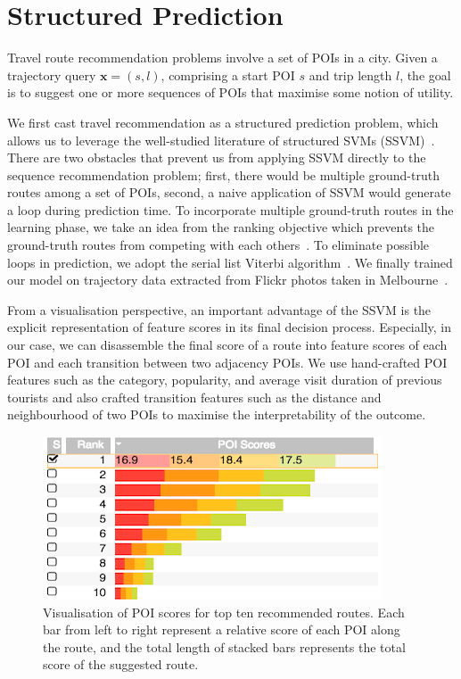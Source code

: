 \section{Structured Prediction}
Travel route recommendation problems involve a set of POIs in a city. 
Given a trajectory query $\mathbf{x} = (s, l)$, comprising a start POI $s$ and trip length $l$, the goal is to suggest one or more sequences of POIs that maximise some notion of utility.

We first cast travel recommendation as a structured prediction problem, which allows us to leverage the well-studied literature of structured SVMs (SSVM)~\cite{tsochantaridis2005large,joachims2009predicting}. 
There are two obstacles that prevent us from applying SSVM directly to the sequence recommendation problem; first, there would be multiple ground-truth routes among a set of POIs, second, a naive application of SSVM would generate a loop during prediction time. 
To incorporate multiple ground-truth routes in the learning phase, we take an idea from the ranking objective which prevents the ground-truth routes from competing with each others~\cite{rendle2009bpr}. 
To eliminate possible loops in prediction, we adopt the serial list Viterbi algorithm~\cite{seshadri1994list,nill1995list,nilsson2001sequentially}.
We finally trained our model on trajectory data extracted from Flickr photos taken in Melbourne~\cite{chen2016learning}.

From a visualisation perspective, an important advantage of the SSVM is the explicit representation of feature scores in its final decision process. Especially, in our case, we can disassemble the final score of a route into feature scores of each POI and each transition between two adjacency POIs. 
We use hand-crafted POI features such as the category, popularity, and average visit duration of previous tourists and also crafted transition features such as the distance and neighbourhood of two POIs to maximise the interpretability of the outcome.

\begin{figure}[t!]
\includegraphics[width=0.8\linewidth]{figure/sample_stack.png}
\caption{Visualisation of POI scores for top ten recommended routes. Each bar from left to right represent a relative score of each POI along the route, and the total length of stacked bars represents the total score of the suggested route.}
\label{fig:stack}
\end{figure}